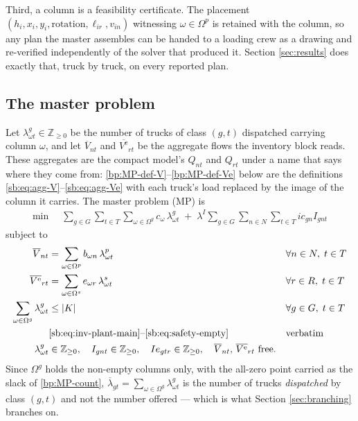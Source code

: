 Third, a column is a feasibility certificate. The placement
$(h_{i},x_{i},y_{i},\text{rotation},\ell_{ir},v_{in})$ witnessing
$\omega\in\Omega^{p}$ is retained with the column, so any plan the
master assembles can be handed to a loading crew as a drawing and
re-verified independently of the solver that produced it. Section
\ref{sec:results} does exactly that, truck by truck, on every reported
plan.

\subsection{The master problem}
\label{sec:mp}

Let $\lambda^{g}_{\omega t}\in\mathbb{Z}_{\ge0}$ be the number of
trucks of class $(g,t)$ dispatched carrying column $\omega$, and let
$\overline{V}_{nt}$ and $\overline{V^{\mathrm{e}}}_{rt}$ be the
aggregate flows the inventory block reads. These aggregates are the
compact model's $Q_{nt}$ and $Q_{rt}$ under a name that says where
they come from: \eqref{bp:MP-def-V}--\eqref{bp:MP-def-Ve} below are the
definitions \eqref{sb:eq:agg-V}--\eqref{sb:eq:agg-Ve} with
each truck's load replaced by the image of the column it carries. The
master problem (MP) is
\begin{align}
  \min\;\; & \sum_{g\in G}\sum_{t\in T}\sum_{\omega\in \Omega^{g}}
                c_{\omega}\,\lambda^{g}_{\omega t}
    \;+\;\lambda^{I}\sum_{g\in G}\sum_{n\in N}\sum_{t\in T} ic_{gn} I_{gnt}
    \label{eq:MPObjective}
\end{align}
subject to
\begin{align}
  \overline{V}_{nt}
    &= \sum_{\omega\in \Omega^{p}} b_{\omega n}\,\lambda^{p}_{\omega t}
    &&\forall n\in N,\;t\in T \label{bp:MP-def-V}\\
  \overline{V^{\mathrm{e}}}_{rt}
    &= \sum_{\omega\in \Omega^{s}} e_{\omega r}\,\lambda^{s}_{\omega t}
    &&\forall r\in R,\;t\in T \label{bp:MP-def-Ve}\\
  \sum_{\omega\in \Omega^{g}} \lambda^{g}_{\omega t} &\le |K|
    &&\forall g\in G,\;t\in T \label{bp:MP-count}\\
  &\text{\eqref{sb:eq:inv-plant-main}--\eqref{sb:eq:safety-empty}}
    &&\text{verbatim} \nonumber\\
  \lambda^{g}_{\omega t}&\in\mathbb{Z}_{\ge0},\quad
  I_{gnt}\in\mathbb{Z}_{\ge0},\quad
  Ie_{gtr}\in\mathbb{Z}_{\ge0},\quad
  \overline{V}_{nt},\,\overline{V^{\mathrm{e}}}_{rt}\ \text{free}.
    \nonumber
\end{align}
Since $\Omega^{g}$ holds the non-empty columns only, with the all-zero
point carried as the slack of \eqref{bp:MP-count},
$\overline{\lambda}_{gt}=\sum_{\omega\in\Omega^{g}}\lambda^{g}_{\omega t}$
is the number of trucks \emph{dispatched} by class $(g,t)$ and not the
number offered --- which is what Section \ref{sec:branching} branches
on.

